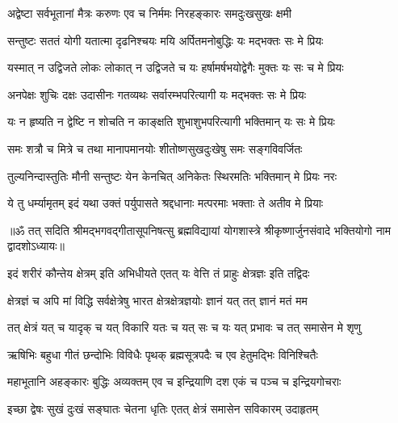 \twolineshloka
{अद्वेष्टा सर्वभूतानां मैत्रः करुणः एव च}
{निर्ममः निरहङ्कारः समदुःखसुखः क्षमी}%

\twolineshloka
{सन्तुष्टः सततं योगी यतात्मा दृढनिश्चयः}
{मयि अर्पितमनोबुद्धिः यः मद्भक्तः सः मे प्रियः}%

\twolineshloka
{यस्मात् न उद्विजते लोकः लोकात् न उद्विजते च यः}
{हर्षामर्षभयोद्वेगैः मुक्तः यः सः च मे प्रियः}%

\twolineshloka
{अनपेक्षः शुचिः दक्षः उदासीनः गतव्यथः}
{सर्वारम्भपरित्यागी यः मद्भक्तः सः मे प्रियः}%

\twolineshloka
{यः न हृष्यति न द्वेष्टि न शोचति न काङ्क्षति}
{शुभाशुभपरित्यागी भक्तिमान् यः सः मे प्रियः}%

\twolineshloka
{समः शत्रौ च मित्रे च तथा मानापमानयोः}
{शीतोष्णसुखदुःखेषु समः सङ्गविवर्जितः}%

\twolineshloka
{तुल्यनिन्दास्तुतिः मौनी सन्तुष्टः येन केनचित्}
{अनिकेतः स्थिरमतिः भक्तिमान् मे प्रियः नरः}%

\twolineshloka
{ये तु धर्म्यामृतम् इदं यथा उक्तं पर्युपासते}
{श्रद्दधानाः मत्परमाः भक्ताः ते अतीव मे प्रियाः}%

{॥ॐ तत् सदिति श्रीमद्भगवद्गीतासूपनिषत्सु ब्रह्मविद्यायां योगशास्त्रे श्रीकृष्णार्जुनसंवादे भक्तियोगो नाम द्वादशोऽध्यायः॥}





\twolineshloka
{इदं शरीरं कौन्तेय क्षेत्रम् इति अभिधीयते}
{एतत् यः वेत्ति तं प्राहुः क्षेत्रज्ञः इति तद्विदः}%

\twolineshloka
{क्षेत्रज्ञं च अपि मां विद्धि सर्वक्षेत्रेषु भारत}
{क्षेत्रक्षेत्रज्ञयोः ज्ञानं यत् तत् ज्ञानं मतं मम}%

\twolineshloka
{तत् क्षेत्रं यत् च यादृक् च यत् विकारि यतः च यत्}
{सः च यः यत् प्रभावः च तत् समासेन मे शृणु}%

\twolineshloka
{ऋषिभिः बहुधा गीतं छन्दोभिः विविधैः पृथक्}
{ब्रह्मसूत्रपदैः च एव हेतुमद्भिः विनिश्चितैः}%

\twolineshloka
{महाभूतानि अहङ्कारः बुद्धिः अव्यक्तम् एव च}
{इन्द्रियाणि दश एकं च पञ्च च इन्द्रियगोचराः}%

\twolineshloka
{इच्छा द्वेषः सुखं दुःखं सङ्घातः चेतना धृतिः}
{एतत् क्षेत्रं समासेन सविकारम् उदाहृतम्}%

